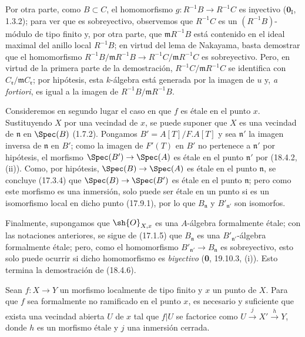 Por otra parte, como $B\subset C$, el homomorfismo $g:R^{-1}B\to R^{-1}C$ es inyectivo ($\mathbf{0}_{\mathrm I}$, 1.3.2); para ver que es sobreyectivo, observemos que $R^{-1}C$ es un $(R^{-1}B)$-módulo de tipo finito y, por otra parte, que $\mathfrak mR^{-1}B$ está contenido en el ideal maximal del anillo local $R^{-1}B$; en virtud del lema de Nakayama, basta demostrar que el homomorfismo
$R^{-1}B/\mathfrak mR^{-1}B\to R^{-1}C/\mathfrak mR^{-1}C$
es sobreyectivo. Pero, en virtud de la primera parte de la demostración, $R^{-1}C/\mathfrak mR^{-1}C$ se identifica con $C_{\mathfrak r}/\mathfrak mC_{\mathfrak r}$; por hipótesis, esta $k$-álgebra está generada por la imagen de $u$ y, \emph{a fortiori}, es igual a la imagen de $R^{-1}B/\mathfrak mR^{-1}B$.

Consideremos en segundo lugar el caso en que $f$ es étale en el punto $x$. Sustituyendo $X$ por una vecindad de $x$, se puede suponer que $X$ es una vecindad de $\mathfrak n$ en $\Spec(B)$ (1.7.2). Pongamos $B'=A[T]/F.A[T]$ y sea $\mathfrak n'$ la imagen inversa de $\mathfrak n$ en $B'$; como la imagen de $F'(T)$ en $B'$ no pertenece a $\mathfrak n'$ por hipótesis, el morfismo $\Spec(B')\to\Spec(A)$ es étale en el punto $\mathfrak n'$ por (18.4.2, (ii)). Como, por hipótesis, $\Spec(B)\to\Spec(A)$ es étale en el punto $\mathfrak n$, se concluye (17.3.4) que $\Spec(B)\to\Spec(B')$ es étale en el punto $\mathfrak n$; pero como este morfismo es una inmersión, solo puede ser étale en un punto si es un isomorfismo local en dicho punto (17.9.1), por lo que $B_{\mathfrak n}$ y $B'_{\mathfrak n'}$ son isomorfos.

Finalmente, supongamos que $\sh{O}_{X,x}$ es una $A$-álgebra formalmente étale; con las notaciones anteriores, se sigue de (17.1.5) que $B_{\mathfrak n}$ es una $B'_{\mathfrak n'}$-álgebra formalmente étale; pero, como el homomorfismo $B'_{\mathfrak n'}\to B_{\mathfrak n}$ es sobreyectivo, esto solo puede ocurrir si dicho homomorfismo es \emph{biyectivo} (\textbf 0, 19.10.3, (i)). Esto termina la demostración de (18.4.6).

\begin{corollary}[18.4.7]
\label{IV.18.4.7}
Sean $f:X\to Y$ un morfismo localmente de tipo finito y $x$ un punto de $X$. Para que $f$ sea formalmente no ramificado en el punto $x$, es necesario y suficiente que exista una vecindad abierta $U$ de $x$ tal que $f|U$ se factorice como $U\xrightarrow{j}X'\xrightarrow{h}Y$, donde $h$ es un morfismo étale y $j$ una inmersión cerrada.
\end{corollary}

